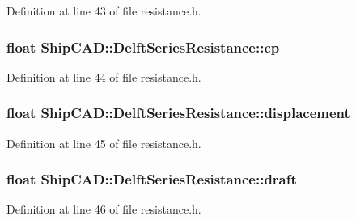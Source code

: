 Definition at line 43 of file resistance.\+h.

\subsubsection[{\texorpdfstring{cp}{cp}}]{\setlength{\rightskip}{0pt plus 5cm}float Ship\+C\+A\+D\+::\+Delft\+Series\+Resistance\+::cp}\hypertarget{structShipCAD_1_1DelftSeriesResistance_ae489114ad6f1d03758420f77b58de519}{}\label{structShipCAD_1_1DelftSeriesResistance_ae489114ad6f1d03758420f77b58de519}


Definition at line 44 of file resistance.\+h.

\subsubsection[{\texorpdfstring{displacement}{displacement}}]{\setlength{\rightskip}{0pt plus 5cm}float Ship\+C\+A\+D\+::\+Delft\+Series\+Resistance\+::displacement}\hypertarget{structShipCAD_1_1DelftSeriesResistance_a1c98fdc7b3c1b28f6f8029af2e009992}{}\label{structShipCAD_1_1DelftSeriesResistance_a1c98fdc7b3c1b28f6f8029af2e009992}


Definition at line 45 of file resistance.\+h.

\subsubsection[{\texorpdfstring{draft}{draft}}]{\setlength{\rightskip}{0pt plus 5cm}float Ship\+C\+A\+D\+::\+Delft\+Series\+Resistance\+::draft}\hypertarget{structShipCAD_1_1DelftSeriesResistance_a208e360c5ca0d029f9f433a7bc2cade2}{}\label{structShipCAD_1_1DelftSeriesResistance_a208e360c5ca0d029f9f433a7bc2cade2}


Definition at line 46 of file resistance.\+h.

